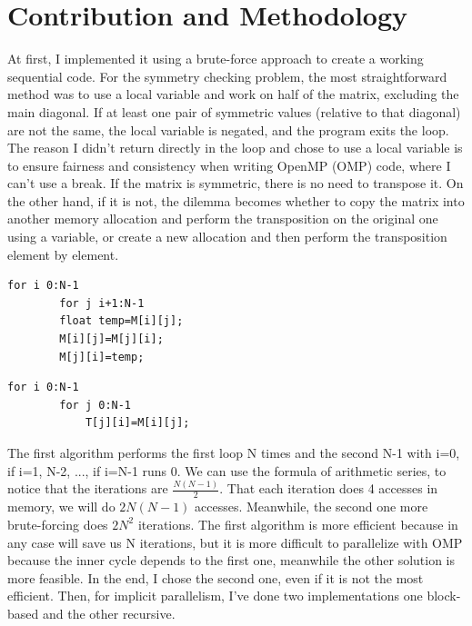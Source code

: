 \section{Contribution and Methodology}
At first, I implemented it using a brute-force approach to create a working sequential code. For the symmetry checking problem, the most straightforward method was to use a local variable and work on half of the matrix, excluding the main diagonal. If at least one pair of symmetric values (relative to that diagonal) are not the same, the local variable is negated, and the program exits the loop. The reason I didn't return directly in the loop and chose to use a local variable is to ensure fairness and consistency when writing OpenMP (OMP) code, where I can’t use a break. If the matrix is symmetric, there is no need to transpose it. On the other hand, if it is not, the dilemma becomes whether to copy the matrix into another memory allocation and perform the transposition on the original one using a variable, or create a new allocation and then perform the transposition element by element.
\begin{minipage}[t]{0.5\columnwidth} 
    \begin{lstlisting}[style=Cstyle, caption={Temporary}]
    for i 0:N-1 
        for j i+1:N-1
        float temp=M[i][j];
        M[i][j]=M[j][i];
        M[j][i]=temp;
    \end{lstlisting}
    \end{minipage}\hfill
    \begin{minipage}[t]{0.5\columnwidth}
    \begin{lstlisting}[style=Cstyle, caption={General}]
    for i 0:N-1 
        for j 0:N-1 
            T[j][i]=M[i][j];
    \end{lstlisting}
    \end{minipage}
The first algorithm performs the first loop N times and the second N-1 with i=0, if i=1, N-2, ..., if i=N-1 runs 0. We can use the formula of arithmetic series\cite{arithmetic_series}, to notice that the iterations are $\frac{N(N-1)}{2}$.
That each iteration does 4 accesses in memory, we will do $2N(N-1)$ accesses. Meanwhile, the second one more brute-forcing does $2N^2$ iterations. The first algorithm is more efficient because in any case will save us N iterations, but it is more difficult to parallelize with OMP because the inner cycle depends to the first one, meanwhile the other solution is more feasible. In the end, I chose the second one, even if it is not the most efficient. Then, for implicit parallelism, I’ve done two implementations one block-based and the other recursive.
